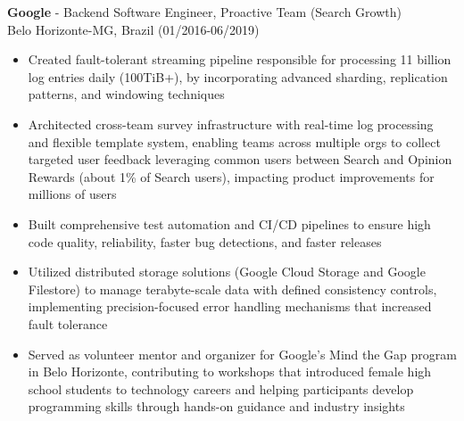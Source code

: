 
\normalsize{\textbf{Google} - Backend Software Engineer, Proactive Team (Search Growth)}\\
    \footnotesize{Belo Horizonte-MG, Brazil (01/2016-06/2019)}
    
\begin{itemize}
    \item \small{Created fault-tolerant streaming pipeline responsible for processing 11 billion
        log entries daily (100TiB+), by incorporating advanced sharding, replication patterns, and
        windowing techniques}

    \item \small{Architected cross-team survey infrastructure with real-time log processing and flexible 
        template system, enabling teams across multiple orgs to collect targeted user feedback 
        leveraging common users between Search and Opinion Rewards (about 1\% of Search users),
        impacting product improvements for millions of users}

    \item \small{Built comprehensive test automation and CI/CD pipelines to ensure high code 
        quality, reliability, faster bug detections, and faster releases}

    \clearpage

    \item \small{Utilized distributed storage solutions (Google Cloud Storage and Google
        Filestore) to manage terabyte-scale data with defined consistency controls, implementing
        precision-focused error handling mechanisms that increased fault tolerance}

    \item \small{Served as volunteer mentor and organizer for Google's Mind the Gap program 
        in Belo Horizonte, contributing to workshops that introduced female high school students to 
        technology careers and helping participants develop programming skills through hands-on 
        guidance and industry insights}
\end{itemize}